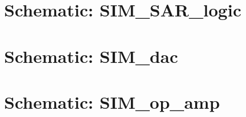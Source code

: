 \documentclass[english, a4paper,11pt]{article}
\begin{document}
\section*{Schematic: SIM\_SAR\_logic}


\section*{Schematic: SIM\_dac}


\section*{Schematic: SIM\_op\_amp}



\end{document}
